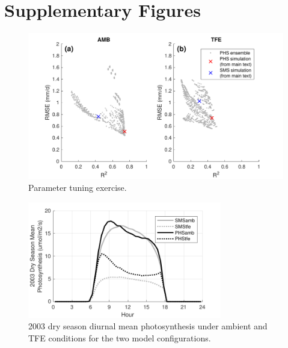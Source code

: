 \documentclass[draft,linenumbers]{agujournal}
\begin{document}
\clearpage

\appendix

\section{Supplementary Figures}


      \begin{figure}[h]
     \centering
     \includegraphics[width=30pc]{../figs3/ens.pdf}
     \caption{Parameter tuning exercise.
     }
     \label{supp:ens}
       \end{figure}
         \clearpage

        \clearpage

    \begin{figure}[h]
     \centering
     \includegraphics[width=20pc]{../figs3/suppfpsn.pdf}
     \caption{2003 dry season diurnal mean photosynthesis under ambient and TFE conditions for the two model configurations.
     }
     \label{supp:fpsn}
  \end{figure}
\end{document}
